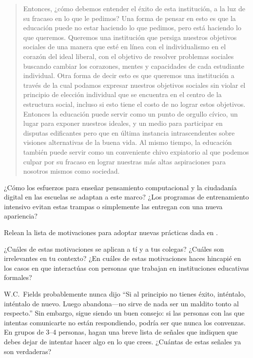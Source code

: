 \begin{quote}

Entonces, ¿cómo debemos entender el éxito de esta institución,
a la luz de su fracaso en lo que le pedimos?
Una forma de pensar en esto es que
la educación puede no estar haciendo lo que pedimos,
pero está haciendo lo que queremos.
Queremos una institución que persiga nuestros objetivos sociales
de una manera que esté en línea con el individualismo en el corazón del ideal liberal,
con el objetivo de resolver problemas sociales
buscando cambiar los corazones, mentes y capacidades de cada estudiante individual.
Otra forma de decir esto es que
queremos una institución a través de la cual podamos expresar nuestros objetivos sociales
sin violar el principio de elección individual
que se encuentra en el centro de la estructura social,
incluso si esto tiene el costo de no lograr estos objetivos.
Entonces la educación puede servir como un punto de orgullo cívico,
un lugar para exponer nuestros ideales,
y un medio para participar en disputas edificantes pero  que en última instancia intrascendentes
sobre visiones alternativas de la buena vida.
Al mismo tiempo,
la educación también puede servir como un conveniente chivo expiatorio
al que podemos culpar por su fracaso en lograr nuestras más altas aspiraciones para nosotros mismos como sociedad.

\end{quote}

¿Cómo los esfuerzos para enseñar pensamiento computacional y la ciudadanía digital en las escuelas se adaptan a este marco?
¿Los programas de entrenamiento intensivo evitan estas trampas o simplemente las entregan con una nueva apariencia?


Relean la lista de motivaciones para adoptar nuevas prácticas
dada en .

¿Cuáles de estas motivaciones se aplican a tí y a tus colegas?
¿Cuáles son irrelevantes en tu contexto?
¿En cuáles de estas motivaciones haces hincapié
en los casos en que interactúas con personas que trabajan en instituciones educativas formales?



W.C.~Fields probablemente nunca dijo
``Si al principio no tienes éxito, inténtalo, inténtalo de nuevo.
Luego abandona---no sirve de nada ser un maldito tonto al respecto.''
Sin embargo, sigue siendo un buen consejo:
si las personas con las que intentas comunicarte no están respondiendo,
podría ser que nunca los convenzas.
En grupos de 3--4 personas,
hagan una breve lista de señales que indiquen que debes dejar de intentar hacer algo en lo que crees.
¿Cuántas de estas señales ya son verdaderas?


